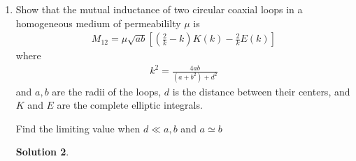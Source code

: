 \documentclass[letter,12pt]{article}
\theoremstyle{definition}
\newtheorem*{sol}{Solution}
\begin{document}
\begin{enumerate}
\begin{enumerate}
\begin{sol}
\begin{align*}
                        (I_1 \pi a^2) \frac{\mu_0 I_2 \cos \alpha}{2 \pi d}
                        \\
                        &=
                        m_1 B_{2z}
                    \end{align*}
                    The sign is positive because the magnetic field
                    and the magnetic moment oppose each other.
                \end{sol}
        \end{enumerate}
    \item
        Show that the mutual inductance of two circular coaxial loops
        in a homogeneous medium of permeabililty $\mu$ is
        \begin{align*}
            M_{12} = \mu \sqrt{ab}
            \left[
                \left(
                    \frac{2}{k}
                    -
                    k
                \right)
                K(k)
                -
                \frac{2}{k}
                E(k)
            \right]
        \end{align*}
        where
        \begin{align*}
            k^2 =
            \frac{4ab}{(a + b^2) + d^2}
        \end{align*}
        and $a, b$ are the radii of the loops, $d$ is the distance
        between their centers, and $K$ and $E$ are the complete
        elliptic integrals.

        Find the limiting value when $d \ll a,b$ and $a \simeq b$
        \begin{sol}
          \begin{figure}[H]
\end{figure}
\end{sol}
\end{enumerate}
\end{document}
